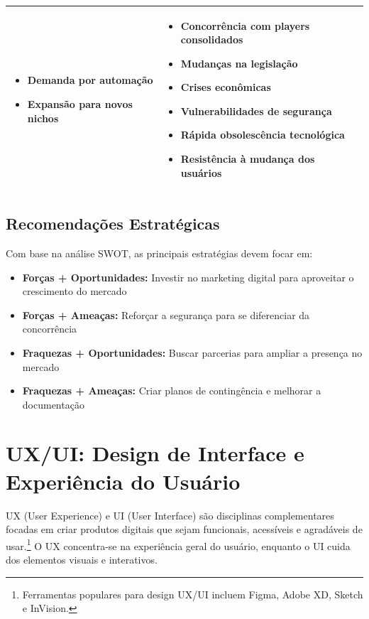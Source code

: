 \documentclass[11pt,a4paper]{article}
\begin{document}
\begin{table}[H]
\begin{tabular}{|p{7.2cm}|p{7.2cm}|}
\begin{minipage}[t]{7cm}
\begin{itemize}
    \item Demanda por automação
    \item Expansão para novos nichos
\end{itemize}
\end{minipage}
&
\begin{minipage}[t]{7cm}
\begin{itemize}
    \item Concorrência com players consolidados
    \item Mudanças na legislação
    \item Crises econômicas
    \item Vulnerabilidades de segurança
    \item Rápida obsolescência tecnológica
    \item Resistência à mudança dos usuários
\end{itemize}
\end{minipage}
\\
\hline
\end{tabular}
\end{table}

\subsection{Recomendações Estratégicas}

Com base na análise SWOT, as principais estratégias devem focar em:
\begin{itemize}
    \item \textbf{Forças + Oportunidades:} Investir no marketing digital para aproveitar o crescimento do mercado
    \item \textbf{Forças + Ameaças:} Reforçar a segurança para se diferenciar da concorrência
    \item \textbf{Fraquezas + Oportunidades:} Buscar parcerias para ampliar a presença no mercado
    \item \textbf{Fraquezas + Ameaças:} Criar planos de contingência e melhorar a documentação
\end{itemize}

\section{UX/UI: Design de Interface e Experiência do Usuário}

UX (User Experience) e UI (User Interface) \cite{silva2025} são disciplinas complementares focadas em criar produtos digitais que sejam funcionais, acessíveis e agradáveis de usar.\footnote{Ferramentas populares para design UX/UI incluem Figma, Adobe XD, Sketch e InVision.} O UX concentra-se na experiência geral do usuário, enquanto o UI cuida dos elementos visuais e interativos.
\end{document}

